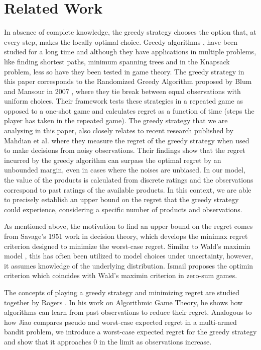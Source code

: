 \section{Related Work}
In absence of complete knowledge, the greedy strategy chooses the option that, at every step, makes the locally optimal choice. 
Greedy algorithms \cite{CLRS1990,Wang2023}, have been studied for a long time and although they have applications in multiple problems, like finding shortest paths, minimum spanning trees and in the Knapsack problem, less so have they been tested in game theory. The greedy strategy in this paper corresponds to the Randomized Greedy Algorithm proposed by Blum and Mansour in 2007 \cite{BM2007}, where they tie break between equal observations with uniform choices. Their framework tests these strategies in a repeated game as opposed to a one-shot game and calculates regret as a function of time (steps the player has taken in the repeated game). The greedy strategy that we are analysing in this paper, also closely relates to recent research published by Mahdian et al. \cite{MJK2022} where they measure the regret of the greedy strategy when used to make decisions from noisy observations. Their findings show that the regret incurred by the greedy algorithm can surpass the optimal regret by an unbounded margin, even in cases where the noises are unbiased. In our model, the value of the products is calculated from discrete ratings and the observations correspond to past ratings of the available products. In this context, we are able to precisely establish an upper bound on the regret that the greedy strategy could experience, considering a specific number of products and observations.

As mentioned above, the motivation to find an upper bound on the regret comes from Savage's 1951 work \cite{Savage1951} in decision theory, which develops the minimax regret criterion designed to minimize the worst-case regret. Similar to Wald's maximin model \cite{Wald1950}, this has often been utilized to model choices under uncertainty, however, it assumes knowledge of the underlying distribution. Ismail \cite{Ismail2020} proposes the optimin criterion which coincides with Wald's maximin criterion in zero-sum games.

The concepts of playing a greedy strategy and minimizing regret are studied together by Rogers \cite{Rogers2011}. In his work on Algorithmic Game Theory, he shows how algorithms can learn from past observations to reduce their regret. Analogous to how Jiao \cite{Jiao2021} compares pseudo and worst-case expected regret in a multi-armed bandit problem, we introduce a worst-case expected regret for the greedy strategy and show that it approaches 0 in the limit as observations increase. 


